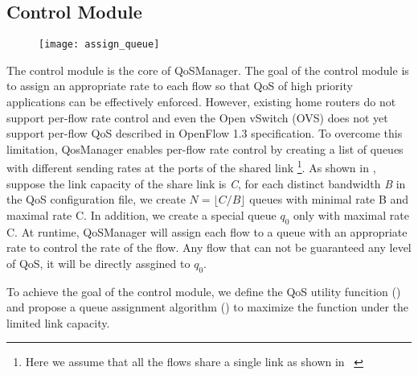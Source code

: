 %

\subsection{Control Module}

\begin{figure}[htb]
  \centering
  \texttt{[image: assign\_queue]}
  \caption{}
  \label{fig:assign_queue}
\end{figure}

The control module is the core of QoSManager. The goal of the control module is to assign an appropriate rate to each flow so that
QoS of high priority applications can be effectively enforced. However, existing home routers do not support per-flow rate control
and even the Open vSwitch (OVS) does not yet support per-flow QoS described in OpenFlow 1.3 specification. To overcome this limitation,
QosManager enables per-flow rate control by creating a list of queues with different sending rates at the ports of the shared link
\footnote{Here we assume that all the flows share a single link as shown in ~}. As shown in ,
suppose the link capacity of the share link is \emph{C}, for each distinct bandwidth \emph{B} in the QoS configuration file,
we create $ N = \lfloor C / B \rfloor $ queues with minimal rate B and maximal rate C. In addition, we create a special queue $q_0$
only with maximal rate C. At runtime, QoSManager will assign each flow to a queue with an appropriate rate to control the rate of the
flow. Any flow that can not be guaranteed any level of QoS, it will be directly assgined to $q_0$.

To achieve the goal of the control module, we define the QoS utility funcition () and propose a queue assignment
algorithm () to maximize the function under the limited link capacity.

